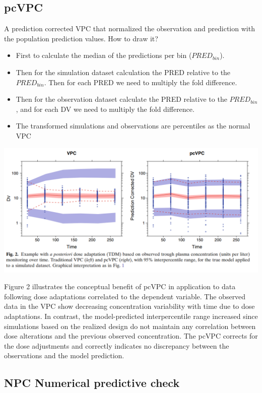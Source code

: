 \documentclass[
]{book}
\providecommand{\tightlist}{%
  \setlength{\itemsep}{0pt}\setlength{\parskip}{0pt}}
\begin{document}
\hypertarget{pcvpc}{%
\subsection{pcVPC}\label{pcvpc}}

A prediction corrected VPC that normalized the observation and prediction with the population prediction values. How to draw it?

\begin{itemize}
\tightlist
\item
  First to calculate the median of the predictions per bin (\(PRED_{bin}\)).
\item
  Then for the simulation dataset calculation the PRED relative to the \(PRED_{bin}\). Then for each PRED we need to multiply the fold difference.
\item
  Then for the observation dataset calculate the PRED relative to the \(PRED_{bin}\), and for each DV we need to multiply the fold difference.
\item
  The transformed simulations and observations are percentiles as the normal VPC
\end{itemize}

\includegraphics{Figures/pcVPC.png}

Figure 2 illustrates the conceptual benefit of pcVPC in application to data following dose adaptations correlated to the dependent variable. The observed data in the VPC show decreasing concentration variability with time due to dose adaptations. In contrast, the model-predicted interpercentile range increased since simulations based on the realized design do not maintain any correlation between dose alterations and the previous observed concentration. The pcVPC corrects for the dose adjustments and correctly indicates no discrepancy between the observations and the model prediction.

\hypertarget{npc-numerical-predictive-check}{%
\subsection{NPC Numerical predictive check}\label{npc-numerical-predictive-check}}
\end{document}
